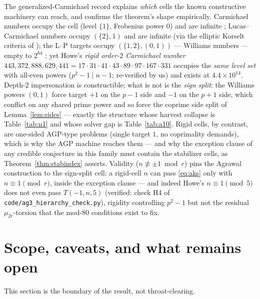 \documentclass[11pt]{article}
\theoremstyle{remark}
\begin{document}
The generalized-Carmichael record explains \emph{which} cells the known
constructive machinery can reach, and confirms the theorem's shape
empirically. Carmichael numbers occupy the cell (level $\{1\}$, Frobenius
power $0$) and are infinite \cite{AGP}; Lucas--Carmichael numbers occupy
$(\{2\}, 1)$ and are infinite \cite{Wright18} (via the elliptic Korselt
criteria of \cite{Silverman12}); the L--P targets occupy
$(\{1,2\}, (0,1))$ --- Williams numbers --- empty to $2^{64}$
\cite{McIntoshMitra}; yet Howe's \emph{rigid order-$2$ Carmichael number}
$443{,}372{,}888{,}629{,}441 = 17\cdot31\cdot41\cdot43\cdot89\cdot97
\cdot167\cdot331$ \cite{Howe00} occupies the \emph{same level set} with
all-even powers ($p^2 - 1 \mid n - 1$; re-verified by us) and exists at
$4.4\times10^{14}$. Depth-$2$ impersonation is constructible; what is not
is the \emph{sign split}: the Williams powers $(0, 1)$ force target $+1$
on the $p-1$ side and $-1$ on the $p+1$ side, which conflict on any
shared prime power and so force the coprime side split of
Lemma~\ref{lem:sides} --- exactly the structure whose harvest collapse is
Table~\ref{tab:n1} and whose solver gap is Table~\ref{tab:a10}. Rigid
cells, by contrast, are one-sided AGP-type problems (single target $1$,
no coprimality demands), which is why the AGP machine reaches them --- and
why the exception clause of any credible conjecture in this family must
contain the stabilizer cells, as Theorem~\ref{thm:stabindex} asserts.
Validity ($n \not\equiv \pm1 \bmod r$) pins the Agrawal construction to
the sign-split cell: a rigid-cell $n$ can pass \eqref{eq:aks} only with
$n \equiv 1 \pmod r$, inside the exception clause --- and indeed Howe's
$n \equiv 1 \pmod 5$ does not even pass $T(-1, n, 5)$ (verified: check H4
of \texttt{code/ag3\_hierarchy\_check.py}), rigidity controlling
$p^2 - 1$ but not the residual $\mu_{2r}$-torsion that the mod-$80$
conditions exist to fix.

\section{Scope, caveats, and what remains open}\label{sec:scope}

This section is the boundary of the result, not throat-clearing.
\end{document}
